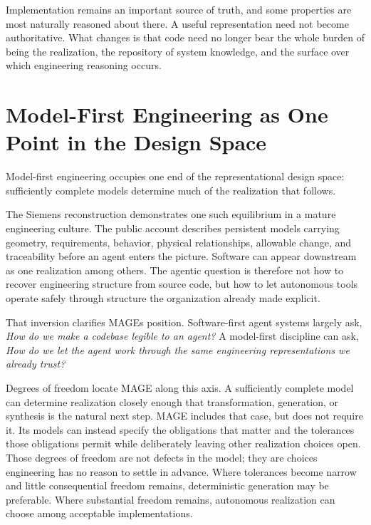 
Implementation remains an important source of truth, and some properties are most naturally reasoned about there. A useful representation need not become authoritative. What changes is that code need no longer bear the whole burden of being the realization, the repository of system knowledge, and the surface over which engineering reasoning occurs.

\section{Model-First Engineering as One Point in the Design Space}\label{heading:model-first-engineering-as-one-point-in-the-design-space}

Model-first engineering occupies one end of the representational design space: sufficiently complete models determine much of the realization that follows.

The Siemens reconstruction demonstrates one such equilibrium in a mature engineering culture. The public account describes persistent models carrying geometry, requirements, behavior, physical relationships, allowable change, and traceability before an agent enters the picture. Software can appear downstream as one realization among others. The agentic question is therefore not how to recover engineering structure from source code, but how to let autonomous tools operate safely through structure the organization already made explicit.

That inversion clarifies MAGE\textquotesingle s position. Software-first agent systems largely ask, \emph{How do we make a codebase legible to an agent?} A model-first discipline can ask, \emph{How do we let the agent work through the same engineering representations we already trust?}

Degrees of freedom locate MAGE along this axis. A sufficiently complete model can determine realization closely enough that transformation, generation, or synthesis is the natural next step. MAGE includes that case, but does not require it. Its models can instead specify the obligations that matter and the tolerances those obligations permit while deliberately leaving other realization choices open. Those degrees of freedom are not defects in the model; they are choices engineering has no reason to settle in advance. Where tolerances become narrow and little consequential freedom remains, deterministic generation may be preferable. Where substantial freedom remains, autonomous realization can choose among acceptable implementations.

